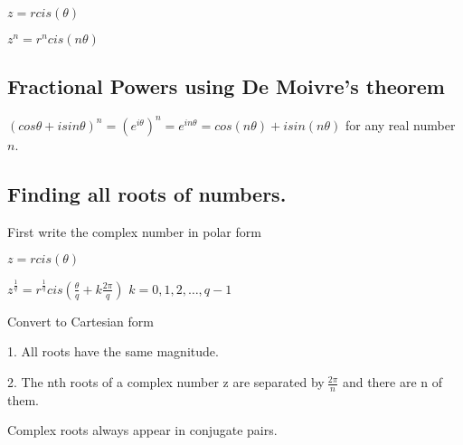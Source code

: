 \documentclass{extarticle}
\begin{document}
\begin{multicols}{2}
$z=rcis\left(\theta\right)$

$z^n=r^ncis\left(n\theta\right)$


\subsection{Fractional Powers using De Moivre's theorem}

$\left(cos\theta+isin\theta\right)^n=\left(e^{i\theta}\right)^n=e^{in\theta}=cos\left(n\theta\right)+isin\left(n\theta\right)$
for any real number $n$.


\subsection{Finding all roots of numbers.}

First write the complex number in polar form

$z=rcis\left(\theta\right)$


$z^\frac{1}{q}=r^\frac{1}{q}cis\left(\frac{\theta}{q}+k\frac{2\pi}{q}\right)$ $k=0,1,2,\ldots,q-1$

Convert to Cartesian form

1. All roots have the same magnitude.

2. The nth roots of a complex number z are separated by$\ \frac{2\pi}{n}$ and there are n of them.

Complex roots always appear in conjugate pairs.




\end{multicols}
\end{document}
